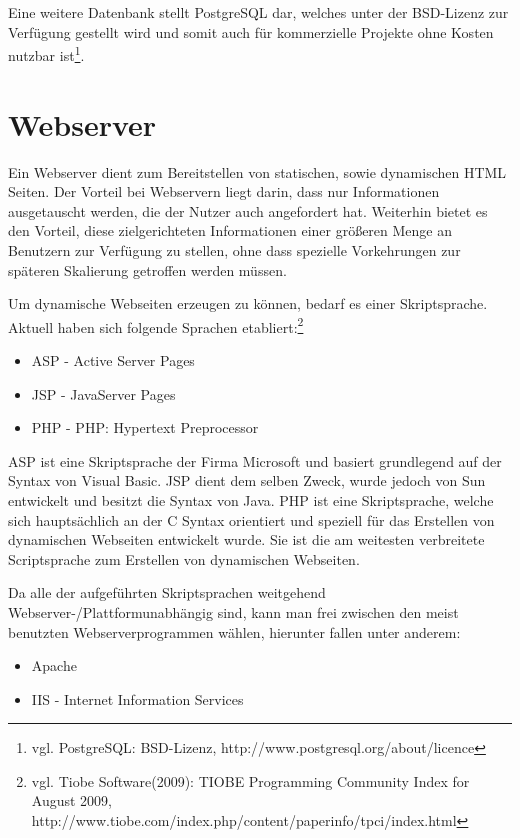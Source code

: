 Eine weitere Datenbank stellt PostgreSQL dar, welches unter der BSD-Lizenz zur Verfügung gestellt wird und somit auch für kommerzielle Projekte ohne Kosten nutzbar ist\footnote{vgl. PostgreSQL: BSD-Lizenz, http://www.postgresql.org/about/licence}.


\section{Webserver}
\label{sec:websrv}

Ein Webserver dient zum Bereitstellen von statischen, sowie dynamischen HTML Seiten.
Der Vorteil bei Webservern liegt darin, dass nur Informationen ausgetauscht werden, die der Nutzer auch angefordert hat.
Weiterhin bietet es den Vorteil, diese zielgerichteten Informationen einer größeren Menge an Benutzern zur Verfügung zu stellen, ohne dass spezielle Vorkehrungen zur späteren Skalierung getroffen werden müssen.

Um dynamische Webseiten erzeugen zu können, bedarf es einer Skriptsprache.
Aktuell haben sich folgende Sprachen etabliert:\footnote{vgl. Tiobe Software(2009): TIOBE Programming Community Index for August 2009, http://www.tiobe.com/index.php/content/paperinfo/tpci/index.html}

\begin{itemize}
\item ASP - Active Server Pages
\item JSP - JavaServer Pages
\item PHP - PHP: Hypertext Preprocessor
\end{itemize}

ASP ist eine Skriptsprache der Firma Microsoft und basiert grundlegend auf der Syntax von Visual Basic.
JSP dient dem selben Zweck, wurde jedoch von Sun entwickelt und besitzt die Syntax von Java.
PHP ist eine Skriptsprache, welche sich hauptsächlich an der C Syntax orientiert und speziell für das Erstellen von
dynamischen Webseiten entwickelt wurde. Sie ist die am weitesten verbreitete Scriptsprache zum Erstellen von dynamischen Webseiten.

Da alle der aufgeführten Skriptsprachen weitgehend Webserver-/Plattformunabhängig sind, kann man frei zwischen den meist benutzten Webserverprogrammen wählen, hierunter fallen unter anderem:


\begin{itemize}
\item Apache
\item IIS - Internet Information Services
\end{itemize}

